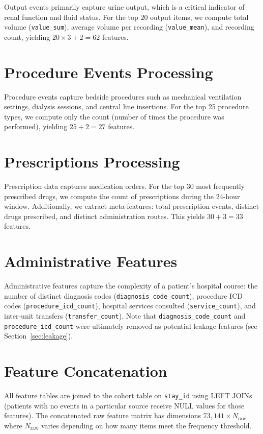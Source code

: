 \documentclass[11pt,a4paper]{report}
\begin{document}
Output events primarily capture urine output, which is a critical indicator of renal function and fluid status. For the top 20 output items, we compute total volume (\texttt{value\_sum}), average volume per recording (\texttt{value\_mean}), and recording count, yielding $20 \times 3 + 2 = 62$ features.

\section{Procedure Events Processing}

Procedure events capture bedside procedures such as mechanical ventilation settings, dialysis sessions, and central line insertions. For the top 25 procedure types, we compute only the count (number of times the procedure was performed), yielding $25 + 2 = 27$ features.

\section{Prescriptions Processing}

Prescription data captures medication orders. For the top 30 most frequently prescribed drugs, we compute the count of prescriptions during the 24-hour window. Additionally, we extract meta-features: total prescription events, distinct drugs prescribed, and distinct administration routes. This yields $30 + 3 = 33$ features.

\section{Administrative Features}

Administrative features capture the complexity of a patient's hospital course: the number of distinct diagnosis codes (\texttt{diagnosis\_code\_count}), procedure ICD codes (\texttt{procedure\_icd\_count}), hospital services consulted (\texttt{service\_count}), and inter-unit transfers (\texttt{transfer\_count}). Note that \texttt{diagnosis\_code\_count} and \texttt{procedure\_icd\_count} were ultimately removed as potential leakage features (see Section~\ref{sec:leakage}).

\section{Feature Concatenation}

All feature tables are joined to the cohort table on \texttt{stay\_id} using LEFT JOINs (patients with no events in a particular source receive NULL values for those features). The concatenated raw feature matrix has dimensions $73{,}141 \times N_{\text{raw}}$ where $N_{\text{raw}}$ varies depending on how many items meet the frequency threshold.
\end{document}
